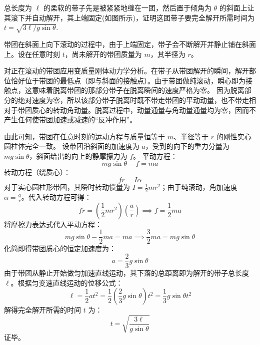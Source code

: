 \begin{exercise}\label{ex:6.3}
总长度为 $\ell$ 的柔软的带子先是被紧紧地缠在一团，然后置于倾角为 $\theta$ 的斜面上让其滚下并自动解开，其上端固定(如图所示)，证明这团带子要完全解开所需时间为 $t = \sqrt{3\ell / g\sin\theta}$.
\begin{center}
\end{center}
\end{exercise}
\begin{solution}
带团在斜面上向下滚动的过程中，由于上端固定，带子会不断解开并静止铺在斜面上。设在任意时刻 $t$，尚未解开的带团质量为 $m$，其半径为 $r$。

对正在滚动的带团应用变质量刚体动力学分析。在带子从带团解开的瞬间，解开部位恰好位于带团的最低点（即与斜面的接触点）。由于带团做纯滚动，瞬心即为接触点，这意味着脱离带团的那部分带子在脱离瞬间的速度严格为零。
因为脱离部分的绝对速度为零，所以该部分带子脱离时既不带走带团的平动动量，也不带走相对于带团质心的转动角动量。脱离过程中，动量通量与角动量通量均为零，因而不产生任何使带团加速或减速的“反冲作用”。

由此可知，带团在任意时刻的运动方程与质量恒等于 $m$、半径等于 $r$ 的刚性实心圆柱体完全一致。
设带团沿斜面的加速度为 $a$，受到的向下的重力分量为 $mg\sin\theta$，斜面给出的向上的静摩擦力为 $f$。
平动方程：
$$ mg \sin\theta - f = m a $$
转动方程（绕质心）：
$$ f r = I \alpha $$
对于实心圆柱形带团，其瞬时转动惯量为 $I = \frac{1}{2} m r^2$；由于纯滚动，角加速度 $\alpha = \frac{a}{r}$。代入转动方程可得：
$$ f r = \left( \frac{1}{2} m r^2 \right) \left( \frac{a}{r} \right) \implies f = \frac{1}{2} m a $$
将摩擦力表达式代入平动方程：
$$ mg \sin\theta - \frac{1}{2} m a = m a \implies \frac{3}{2} m a = mg \sin\theta $$
化简即得带团质心的恒定加速度为：
$$ a = \frac{2}{3} g \sin\theta $$
由于带团从静止开始做匀加速直线运动，其下落的总距离即为解开的带子总长度 $\ell$。根据匀变速直线运动的位移公式：
$$ \ell = \frac{1}{2} a t^2 = \frac{1}{2} \left( \frac{2}{3} g \sin\theta \right) t^2 = \frac{1}{3} g \sin\theta t^2 $$
解得完全解开所需的时间 $t$ 为：
$$ t = \sqrt{\frac{3\ell}{g \sin\theta}} $$
证毕。
\end{solution}

